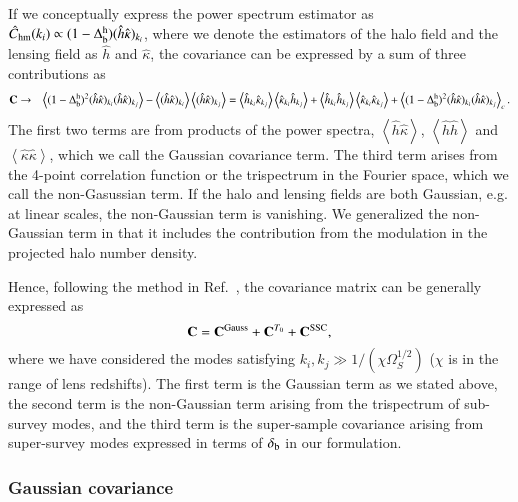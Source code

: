 \documentclass[onecolumn,notitlepage,showpacs,amsmath,amssymb,prd,floatfix]{revtex4-1}
\def\ave#1{\left\langle #1 \right\rangle}
\newcommand{\deltab}{\delta_{\rm b}}
\newcommand{\hchm}{\hat{C}_{\mathrm{hm}}}
\newcommand{\br}{{\rm b}}
\begin{document}
If we conceptually express the power spectrum estimator as
$\hchm(k_i)\propto (1-\Delta^{\rm h}_{\br})(\hat{h}\hat{\kappa})_{k_i}$,
where we denote the estimators of the halo field and the lensing field
as $\hat{h}$ and $\hat{\kappa}$, the covariance can be expressed by a
sum of three contributions as
%
\begin{eqnarray}
 {\bf C}&\rightarrow& \ave{(1-\Delta^{\rm h}_{\br})^2(\hat{h}\hat{\kappa})_{k_i}(\hat{h}\hat{\kappa})_{k_j}
  }-\ave{(\hat{h}\hat{\kappa})_{k_i}}\ave{(\hat{h}\hat{\kappa})_{k_j}}
  =\ave{\hat{h}_{k_i}\hat{\kappa}_{k_j}}\ave{\hat{\kappa}_{k_i}\hat{h}_{k_j}}
  +\ave{\hat{h}_{k_i}\hat{h}_{k_j}}\ave{\hat{\kappa}_{k_i}\hat{\kappa}_{k_j}}
  +\ave{(1-\Delta_{\br}^{\rm h})^2
  (\hat{h}\hat{\kappa})_{k_i}(\hat{h}\hat{\kappa})_{k_j}}_c.
  \label{eq:cov_formal}
\end{eqnarray}
%
The first two terms are from products of the power spectra,
$\ave{\hat{h}\hat{\kappa}}$, $\ave{\hat{h}\hat{h}}$ and
$\ave{\hat{\kappa}\hat{\kappa}}$, which we call the Gaussian covariance
term. The third term arises from the 4-point correlation function or the
trispectrum in the Fourier space, which we call the non-Gasussian term.
If the halo and lensing fields are both Gaussian, e.g. at linear scales,
the non-Gaussian term is vanishing. We generalized the non-Gaussian term
in that it includes the contribution from the modulation in the
projected halo number density. 

Hence, following the method in Ref.~\cite{TakadaHu:13}, the covariance
matrix can be generally expressed as
%
\begin{equation}
 {\bf C}={\bf C}^{\rm Gauss}+{\bf C}^{T_0}+{\bf C}^{\rm SSC}, 
\end{equation}
%
where we have considered the modes satisfying $k_i,k_j\gg
1/(\chi\Omega_{S}^{1/2})$ ($\chi$ is in the range of lens
redshifts). The first term is the Gaussian term as we stated above, the
second term is the non-Gaussian term arising from the trispectrum of
sub-survey modes, and the third term is the super-sample covariance
arising from super-survey modes expressed in terms of $\deltab$ in our
formulation.

\subsubsection{Gaussian covariance}
\end{document}
